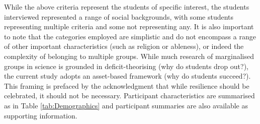 While the above criteria represent the students of specific interest, the students interviewed represented a range of social backgrounds, with some students representing multiple criteria and some not representing any. It is also important to note that the categories employed are simplistic and do not encompass a range of other important characteristics (such as religion or ableness), or indeed the complexity of belonging to multiple groups. While much research of marginalised groups in science is grounded in deficit-theorising (why do students drop out?), the current study adopts an asset-based framework (why do students succeed?). This framing is prefaced by the acknowledgment that while resilience should be celebrated, it should not be necessary. Participant characteristics are summarised as in Table \ref{tab:Demographics} and participant summaries are also available as supporting information. 


